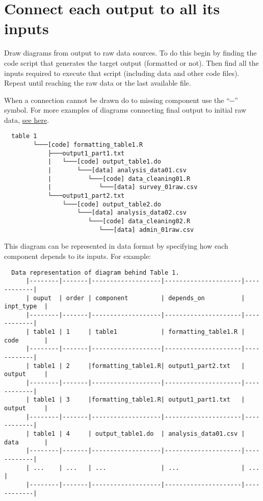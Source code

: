 \documentclass[]{book}
\begin{document}
\hypertarget{diagram}{%
\section{Connect each output to all its inputs}\label{diagram}}

Draw diagrams from output to raw data sources. To do this begin by finding the code script that generates the target output (formatted or not). Then find all the inputs required to execute that script (including data and other code files). Repeat until reaching the raw data or the last available file.

When a connection cannot be drawn do to missing component use the ``-\textbar{}\textbar{}-'' symbol. For more examples of diagrams connecting final output to initial raw data, \protect\hyperlink{additional-diagrams}{see here}.

\begin{verbatim}
  table 1
        └───[code] formatting_table1.R
            ├───output1_part1.txt  
            |   └───[code] output_table1.do           
            |       └───[data] analysis_data01.csv
            |          └───[code] data_cleaning01.R
            |             └───[data] survey_01raw.csv
            └───output1_part2.txt  
                └───[code] output_table2.do           
                    └───[data] analysis_data02.csv
                       └───[code] data_cleaning02.R
                          └───[data] admin_01raw.csv  
\end{verbatim}

This diagram can be represented in data format by specifying how each component depends to its inputs. For example:

\begin{verbatim}
  Data representation of diagram behind Table 1.
      |--------|-------|-------------------|---------------------|------------|
      | ouput  | order | component         | depends_on          | inpt_type  |
      |--------|-------|-------------------|---------------------|------------|
      | table1 | 1     | table1            | formatting_table1.R | code       |
      |--------|-------|-------------------|---------------------|------------|
      | table1 | 2     |formatting_table1.R| output1_part2.txt   | output     |
      |--------|-------|-------------------|---------------------|------------|
      | table1 | 3     |formatting_table1.R| output1_part1.txt   | output     |
      |--------|-------|-------------------|---------------------|------------|
      | table1 | 4     | output_table1.do  | analysis_data01.csv | data       |
      |--------|-------|-------------------|---------------------|------------|
      | ...    | ...   | ...               | ...                 | ...        |
      |--------|-------|-------------------|---------------------|------------|
\end{verbatim}
\end{document}
